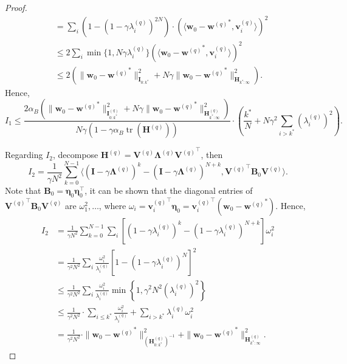 \documentclass[11pt, letterpaper]{article}
\begin{document}
\begin{proof}
\begin{equation}
\begin{aligned}
            &=\sum_{i}\left(1-(1-\gamma\lambda_{i}^{(q)})^{2N}\right)\cdot\left(\langle\mathbf{w}_{0}-{\mathbf{w}^{(q)}}^{*},\mathbf{v}_{i}^{(q)}\rangle\right)^{2}\\
            &\leq 2\sum_i\min\{1,N\gamma\lambda_i^{(q)}\}\left(\langle\mathbf{w}_0-{\mathbf{w}^{(q)}}^*,\mathbf{v}_i^{(q)}\rangle\right)^2\\
            &\leq 2\left(\|\mathbf{w}_{0}-{\mathbf{w}^{(q)}}^{*}\|_{\mathbf{I}_{0:k^{*}}}^{2}+N\gamma\|\mathbf{w}_{0}-{\mathbf{w}^{(q)}}^{*}\|_{\mathbf{H}_{k^{*}:\infty}}^{2}\right).
        \end{aligned}
    \end{equation}
    Hence,
    \begin{equation*}
        I_1\leq\frac{2\alpha_B\left(\|\mathbf{w}_0-{\mathbf{w}^{(q)}}^*\|_{\mathbf{I}_{0:k^*}^{(q)}}^2+N\gamma\|\mathbf{w}_0-{\mathbf{w}^{(q)}}^*\|_{\mathbf{H}_{k^*:\infty}^{(q)}}^2\right)}{N\gamma(1-\gamma\alpha_B\operatorname{tr}(\mathbf{H}^{(q)}))}\cdot\left(\frac{k^*}{N}+N\gamma^2\sum_{i>k^*}(\lambda_i^{(q)})^2\right).
    \end{equation*}

    Regarding $I_2$, decompose $\mathbf{H}^{(q)}=\mathbf{V}^{(q)}\mathbf{\Lambda}^{(q)}{\mathbf{V}^{(q)}}^\top$, then
    \begin{equation*}
        I_2=\frac{1}{\gamma N^2}\sum_{k=0}^{N-1}\langle(\mathbf{I}-\gamma\mathbf{\Lambda}^{(q)})^k-(\mathbf{I}-\gamma\mathbf{\Lambda}^{(q)})^{N+k},{\mathbf{V}^{(q)}}^\top\mathbf{B}_0\mathbf{V}^{(q)}\rangle.
    \end{equation*}
    Note that $\mathbf{B}_0=\boldsymbol{\eta}_0\boldsymbol{\eta}_0^\top$, it can be shown that the diagonal entries of ${\mathbf{V}^{(q)}}^\top\mathbf{B}_0\mathbf{V}^{(q)}$ are $\omega_1^2,\dots$, where $\omega_i={\mathbf{v}_{i}^{(q)}}^{\top}\boldsymbol{\eta}_{0}={\mathbf{v}_{i}^{(q)}}^{\top}(\mathbf{w}_{0}-{\mathbf{w}^{(q)}}^{*})$. Hence,
    \begin{equation*}
        \begin{aligned}
            I_{2} & =\frac{1}{\gamma N^{2}}\sum_{k=0}^{N-1}\sum_{i}\left[(1-\gamma\lambda_{i}^{(q)})^{k}-(1-\gamma\lambda_{i}^{(q)})^{N+k}\right]\omega_{i}^{2} \\
            & =\frac{1}{\gamma^{2}N^{2}}\sum_{i}\frac{\omega_{i}^{2}}{\lambda_{i}^{(q)}}\left[1-(1-\gamma\lambda_{i}^{(q)})^{N}\right]^{2} \\
            & \leq\frac{1}{\gamma^{2}N^{2}}\sum_{i}\frac{\omega_{i}^{2}}{\lambda_{i}^{(q)}}\operatorname*{min}\left\{1,\gamma^{2}N^{2}(\lambda_{i}^{(q)})^{2}\right\} \\
            & \leq\frac{1}{\gamma^{2}N^{2}}\cdot\sum_{i\leq k^{*}}\frac{\omega_{i}^{2}}{\lambda_{i}^{(q)}}+\sum_{i>k^{*}}\lambda_{i}^{(q)}\omega_{i}^{2}\\
            &=\frac{1}{\gamma^2N^2}\cdot\|\mathbf{w}_0-{\mathbf{w}^{(q)}}^*\|_{(\mathbf{H}_{0:k^*}^{(q)})^{-1}}^2+\|\mathbf{w}_0-{\mathbf{w}^{(q)}}^*\|_{\mathbf{H}_{{k^*}:\infty}^{(q)}}^2.
        \end{aligned}
    \end{equation*}


\end{proof}
\end{document}
